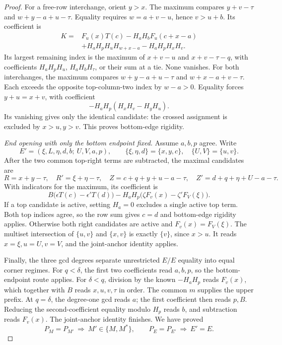 \documentclass[11pt,a4paper]{amsart}
\numberwithin{equation}{section}
\theoremstyle{plain}
\theoremstyle{definition}
\begin{document}
\begin{proof}
For a free-row interchange, orient \(y>x\).  The maximum compares
\(y+v-\tau\) and \(w+y-a+u-\tau\).  Equality requires
\(w=a+v-u\), hence \(v>u+b\).  Its coefficient is
\[
 \begin{aligned}
 K={}&F_u(x)T(c)-H_aH_bF_u(c+x-a)\\
 &+H_aH_pH_uH_{w+x-a}-H_aH_pH_xH_v.
 \end{aligned}
\]
Its largest remaining index is the maximum of
\(x+v-u\) and \(x+v-\tau-q\), with coefficients
\(H_aH_pH_u\), \(H_aH_bH_\tau\), or their sum at a tie.  None
vanishes.  For both interchanges, the maximum compares
\(w+y-a+u-\tau\) and \(w+x-a+v-\tau\).  Each exceeds the opposite
top-column-two index by \(w-a>0\).  Equality forces
\(y+u=x+v\), with coefficient
\[
 -H_aH_p(H_xH_v-H_yH_u).
\]
Its vanishing gives only the identical candidate: the crossed assignment
is excluded by \(x>u,y>v\).  This proves bottom-edge rigidity.  

\emph{End opening with only the bottom endpoint fixed.}
Assume \(a,b,p\) agree.  Write
\[
 E'=(\xi,L,\eta,d,b;\ U,V,a,p),\qquad
 \{\xi,\eta,d\}=\{x,y,c\},\quad \{U,V\}=\{u,v\}.
\]
After the two common top-right terms are subtracted, the maximal
candidates are
\[
 R=x+y-\tau,\quad R'=\xi+\eta-\tau,\quad
 Z=c+q+y+u-a-\tau,\quad Z'=d+q+\eta+U-a-\tau.
\]
With indicators for the maximum, its coefficient is
\[
 B\bigl(\epsilon T(c)-\epsilon'T(d)\bigr)
 -H_aH_p\bigl(\zeta F_v(x)-\zeta'F_V(\xi)\bigr).
\]
If a top candidate is active, setting \(H_a=0\) excludes a single
active top term.  Both top indices agree, so the row sum gives \(c=d\)
and bottom-edge rigidity applies.  Otherwise both right candidates are
active and \(F_v(x)=F_V(\xi)\).  The multiset intersection of
\(\{u,v\}\) and \(\{x,v\}\) is exactly \(\{v\}\), since \(x>u\).  
It reads \(x=\xi,u=U,v=V\), and the joint-anchor identity applies.  

Finally, the three gcd degrees separate unrestricted \(E/E\) equality
into equal corner regimes.  For \(q<\delta\), the first two
coefficients read \(a,b,p\), so the bottom-endpoint route applies.  
For \(\delta<q\), division by the known \(-H_aH_p\) reads
\(F_v(x)\), which together with \(B\) reads \(x,u,v,\tau\) in
order.  The common \(m\) supplies the upper prefix.  At \(q=\delta\),
the degree-one gcd reads \(a\); the first coefficient then reads
\(p,B\).  Reducing the second-coefficient equality modulo \(H_p\)
reads \(b\), and subtraction reads \(F_v(x)\).  The joint-anchor
identity finishes.  We have proved
\begin{equation}\label{eq:within-inventory}
 P_M=P_{M'}\ \Longrightarrow\ M'\in\{M,M^*\},\qquad
 P_E=P_{E'}\ \Longrightarrow\ E'=E.
\end{equation}
\end{proof}
\end{document}
